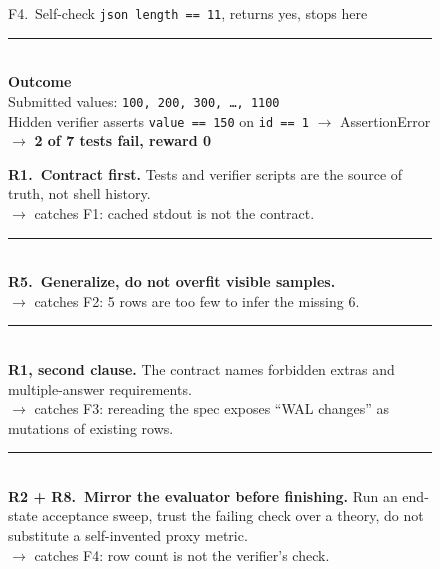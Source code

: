 \begin{figure}[t]
\begin{tcbraster}
\begin{tcolorbox}[colback=aheSky!18,colframe=aheNavy,colbacktitle=aheNavy,
                          title={\scriptsize\textbf{Before \texttt{chg-1}, NexAU\textsubscript{0} seed, iteration 1, reward 0.0}}]
            F4.~Self-check \texttt{json length == 11}, returns yes, stops here \\[3pt]
            \rule{\linewidth}{0.3pt}\\
            \textbf{\textcolor{aheNavy}{Outcome}} \\
            Submitted values: \texttt{100, 200, 300, \dots, 1100} \\
            Hidden verifier asserts \texttt{value == 150} on \texttt{id == 1} $\rightarrow$ AssertionError \\
            $\rightarrow$ \textbf{2 of 7 tests fail, reward 0}
        \end{tcolorbox}
        \begin{tcolorbox}[colback=black!3,colframe=black!65,colbacktitle=black!75,
                          title={\scriptsize\textbf{\texttt{chg-1} rules that close each gap}}]
            \textbf{\textcolor{black!85}{R1.~Contract first.}} Tests and verifier scripts are the source of truth, not shell history. \\
            \textcolor{black!60}{$\rightarrow$ catches F1: cached stdout is not the contract.} \\[3pt]
            \rule{\linewidth}{0.2pt}\\[1pt]
            \textbf{\textcolor{black!85}{R5.~Generalize, do not overfit visible samples.}} \\
            \textcolor{black!60}{$\rightarrow$ catches F2: 5 rows are too few to infer the missing 6.} \\[3pt]
            \rule{\linewidth}{0.2pt}\\[1pt]
            \textbf{\textcolor{black!85}{R1, second clause.}} The contract names forbidden extras and multiple-answer requirements. \\
            \textcolor{black!60}{$\rightarrow$ catches F3: rereading the spec exposes ``WAL changes'' as mutations of existing rows.} \\[3pt]
            \rule{\linewidth}{0.2pt}\\[1pt]
            \textbf{\textcolor{black!85}{R2 + R8.~Mirror the evaluator before finishing.}} Run an end-state acceptance sweep, trust the failing check over a theory, do not substitute a self-invented proxy metric. \\
            \textcolor{black!60}{$\rightarrow$ catches F4: row count is not the verifier's check.}
        \end{tcolorbox}
        \begin{tcolorbox}[colback=aheTeal!12,colframe=aheBlue,colbacktitle=aheBlue,
                          title={\scriptsize\textbf{After \texttt{chg-1}, same seed, iteration 2, reward 1.0}}]

\end{tcolorbox}
\end{tcbraster}
\end{figure}
